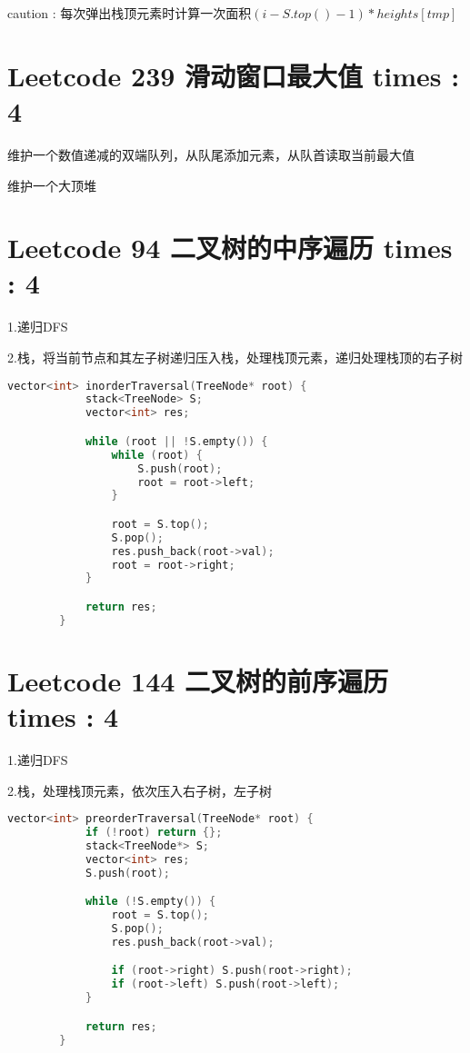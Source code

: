 \documentclass[UTF8]{ctexart}
\begin{document}
caution : 每次弹出栈顶元素时计算一次面积$(i - S.top() - 1) * heights[tmp]$

\section{Leetcode 239 滑动窗口最大值 times : 4}
维护一个数值递减的双端队列，从队尾添加元素，从队首读取当前最大值

维护一个大顶堆


\section{Leetcode 94 二叉树的中序遍历 times : 4}
1.递归DFS

2.栈，将当前节点和其左子树递归压入栈，处理栈顶元素，递归处理栈顶的右子树

\begin{framed}
	\begin{lstlisting}[language=C++]
		vector<int> inorderTraversal(TreeNode* root) {
			stack<TreeNode> S;
			vector<int> res;

			while (root || !S.empty()) {
				while (root) {
					S.push(root);
					root = root->left;
				}

				root = S.top();
				S.pop();
				res.push_back(root->val);
				root = root->right;
			}

			return res;
		}
	\end{lstlisting}
\end{framed}

\section{Leetcode 144 二叉树的前序遍历 times : 4}
1.递归DFS

2.栈，处理栈顶元素，依次压入右子树，左子树

\begin{framed}
	\begin{lstlisting}[language=C++]
		vector<int> preorderTraversal(TreeNode* root) {
			if (!root) return {};
			stack<TreeNode*> S;
			vector<int> res;
			S.push(root);

			while (!S.empty()) {
				root = S.top();
				S.pop();
				res.push_back(root->val);

				if (root->right) S.push(root->right);
				if (root->left) S.push(root->left);
			}

			return res;
		}
	\end{lstlisting}
\end{framed}
\end{document}
